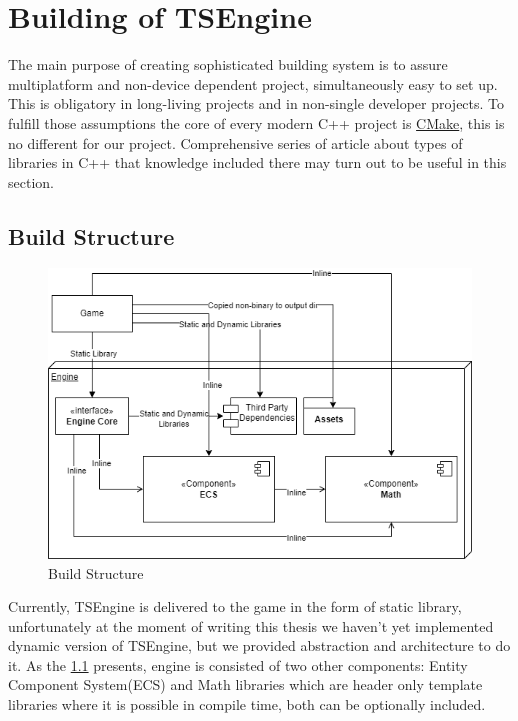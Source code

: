 \newpage
\section{Building of TSEngine}
\label{sec:build}
The main purpose of creating sophisticated building system is to assure multiplatform and non-device dependent project, simultaneously easy to set up.\\ This is obligatory in long-living projects and in non-single developer projects.
To fulfill those assumptions the core of every modern C++ project is \hyperref[sec:stack_cmake]{CMake}, this is no different for our project.
Comprehensive series of article about types of libraries in C++ \cite{cpplibs} that knowledge included there may turn out to be useful in this section.
\subsection{Build Structure}
\label{fig:build_struct}
\begin{figure}[h]
  \includegraphics[width=\linewidth]{figures/build.png}
  \caption{Build Structure}
\end{figure}
Currently, TSEngine is delivered to the game in the form of static library, unfortunately at the moment of writing this thesis we haven't yet implemented dynamic version of TSEngine, but we provided abstraction and architecture to do it.
As the \ref{fig:build_struct} presents, engine is consisted of two other components: Entity Component System(ECS) and Math libraries which are header only template libraries where it is possible in compile time, both can be optionally included.

